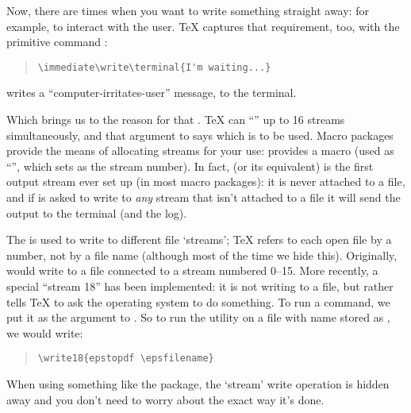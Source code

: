Now, there are times when you want to write something straight away:
for example, to interact with the user.  \TeX{} captures that
requirement, too, with the primitive command :
\begin{quote}
\begin{verbatim}
\immediate\write\terminal{I'm waiting...}
\end{verbatim}
\end{quote}
writes a ``computer-irritates-user'' message, to the terminal.

Which brings us to the reason for that .  \TeX{} can
``'' up to 16 streams simultaneously, and that argument to
 says which is to be used.  Macro packages provide the
means of allocating streams for your use: \plaintex{} provides a macro
 (used as ``'', which sets
 as the stream number).  In fact,  (or
its equivalent) is the first output stream ever set up (in most macro
packages): it is never attached to a file, and if \tex{} is asked to
write to \emph{any} stream that isn't attached to a file it will send
the output to the terminal (and the log).


The \tex{}  is used
to write to different file `streams'; TeX refers to each open file by
a number, not by a file name (although most of the time we hide this).
Originally, \tex{} would write to a file connected to a stream
numbered 0--15.  More recently, a special ``stream 18'' has been
implemented: it is not writing to a file, but rather tells TeX to ask
the operating system to do something.  To run a command, we put it as
the argument to .  So to run the 
utility on a file with name stored as , we would
write:
\begin{quote}
\begin{verbatim}
\write18{epstopdf \epsfilename}
\end{verbatim}
\end{quote}
When using something like the  package, the `stream'
write operation is hidden away and you don't need to worry about the
exact way it's done.

